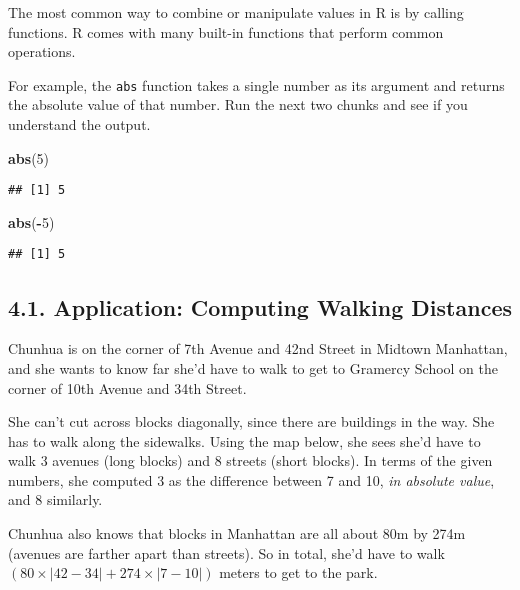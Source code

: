 \documentclass[
]{article}
\newenvironment{Shaded}{\begin{snugshade}}{\end{snugshade}}
\newcommand{\DecValTok}[1]{\textcolor[rgb]{0.00,0.00,0.81}{#1}}
\newcommand{\FunctionTok}[1]{\textcolor[rgb]{0.13,0.29,0.53}{\textbf{#1}}}
\newcommand{\NormalTok}[1]{#1}
\newcommand{\SpecialCharTok}[1]{\textcolor[rgb]{0.81,0.36,0.00}{\textbf{#1}}}
\begin{document}
The most common way to combine or manipulate values in R is by calling
functions. R comes with many built-in functions that perform common
operations.

For example, the \texttt{abs} function takes a single number as its
argument and returns the absolute value of that number. Run the next two
chunks and see if you understand the output.

\begin{Shaded}
\begin{Highlighting}[]
\FunctionTok{abs}\NormalTok{(}\DecValTok{5}\NormalTok{)}
\end{Highlighting}
\end{Shaded}

\begin{verbatim}
## [1] 5
\end{verbatim}

\begin{Shaded}
\begin{Highlighting}[]
\FunctionTok{abs}\NormalTok{(}\SpecialCharTok{{-}}\DecValTok{5}\NormalTok{)}
\end{Highlighting}
\end{Shaded}

\begin{verbatim}
## [1] 5
\end{verbatim}

\subsection{4.1. Application: Computing Walking
Distances}\label{application-computing-walking-distances}

Chunhua is on the corner of 7th Avenue and 42nd Street in Midtown
Manhattan, and she wants to know far she'd have to walk to get to
Gramercy School on the corner of 10th Avenue and 34th Street.

She can't cut across blocks diagonally, since there are buildings in the
way. She has to walk along the sidewalks. Using the map below, she sees
she'd have to walk 3 avenues (long blocks) and 8 streets (short blocks).
In terms of the given numbers, she computed 3 as the difference between
7 and 10, \emph{in absolute value}, and 8 similarly.

Chunhua also knows that blocks in Manhattan are all about 80m by 274m
(avenues are farther apart than streets). So in total, she'd have to
walk \((80 \times |42 - 34| + 274 \times |7 - 10|)\) meters to get to
the park.
\end{document}
